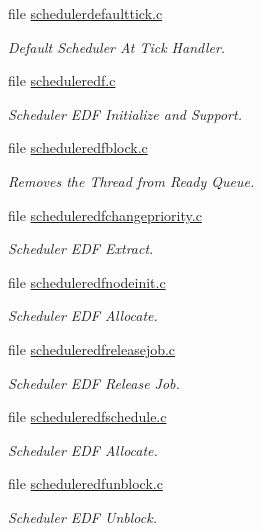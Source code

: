 \begin{DoxyCompactItemize}
file \mbox{\hyperlink{schedulerdefaulttick_8c}{schedulerdefaulttick.\+c}}
\begin{DoxyCompactList}\small\item\em Default Scheduler At Tick Handler. \end{DoxyCompactList}\item 
file \mbox{\hyperlink{scheduleredf_8c}{scheduleredf.\+c}}
\begin{DoxyCompactList}\small\item\em Scheduler E\+DF Initialize and Support. \end{DoxyCompactList}\item 
file \mbox{\hyperlink{scheduleredfblock_8c}{scheduleredfblock.\+c}}
\begin{DoxyCompactList}\small\item\em Removes the Thread from Ready Queue. \end{DoxyCompactList}\item 
file \mbox{\hyperlink{scheduleredfchangepriority_8c}{scheduleredfchangepriority.\+c}}
\begin{DoxyCompactList}\small\item\em Scheduler E\+DF Extract. \end{DoxyCompactList}\item 
file \mbox{\hyperlink{scheduleredfnodeinit_8c}{scheduleredfnodeinit.\+c}}
\begin{DoxyCompactList}\small\item\em Scheduler E\+DF Allocate. \end{DoxyCompactList}\item 
file \mbox{\hyperlink{scheduleredfreleasejob_8c}{scheduleredfreleasejob.\+c}}
\begin{DoxyCompactList}\small\item\em Scheduler E\+DF Release Job. \end{DoxyCompactList}\item 
file \mbox{\hyperlink{scheduleredfschedule_8c}{scheduleredfschedule.\+c}}
\begin{DoxyCompactList}\small\item\em Scheduler E\+DF Allocate. \end{DoxyCompactList}\item 
file \mbox{\hyperlink{scheduleredfunblock_8c}{scheduleredfunblock.\+c}}
\begin{DoxyCompactList}\small\item\em Scheduler E\+DF Unblock. \end{DoxyCompactList}\item 

\end{DoxyCompactItemize}
